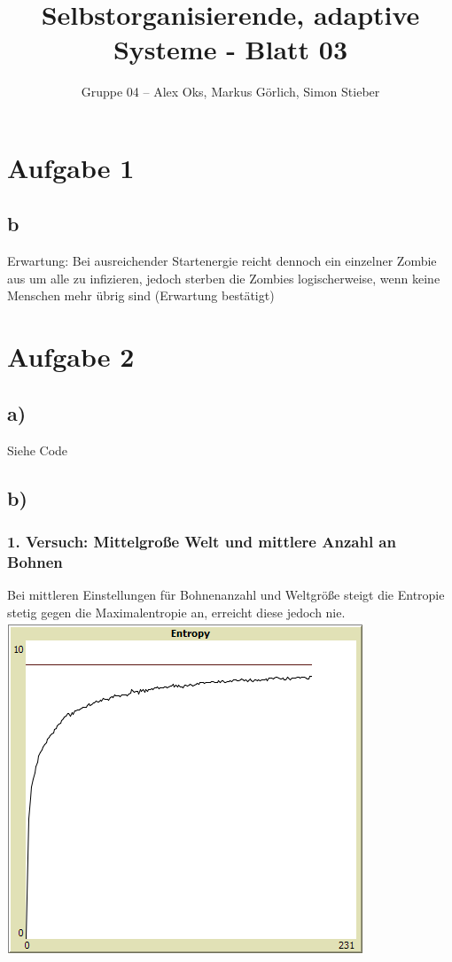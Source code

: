 \documentclass[10pt]{article}%
\theoremstyle{nonumberplain}
\begin{document}
\author{Gruppe 04 -- Alex Oks, Markus Görlich, Simon Stieber}
\title{Selbstorganisierende, adaptive Systeme - Blatt 03}

\maketitle %
\section{Aufgabe 1}
\subsection{b}
Erwartung: Bei ausreichender Startenergie reicht dennoch ein einzelner Zombie aus um alle zu infizieren, jedoch sterben die Zombies logischerweise, wenn keine Menschen mehr übrig sind (Erwartung bestätigt)

\section{Aufgabe 2}
\subsection{a)}
Siehe Code
\subsection{b)}
\subsubsection{1. Versuch: Mittelgroße Welt und mittlere Anzahl an Bohnen}
Bei mittleren Einstellungen für Bohnenanzahl und Weltgröße steigt die Entropie stetig gegen die Maximalentropie an, erreicht diese jedoch nie. \\
\includegraphics [scale = 0.85]{2-mittel.png}
\end{document}
